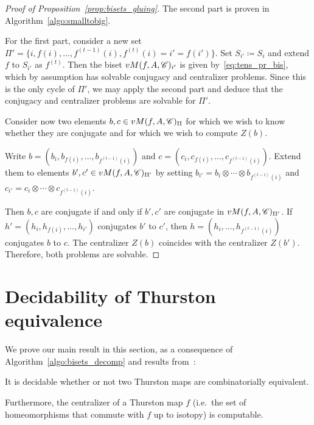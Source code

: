 \documentclass{amsart}
\begin{document}
\begin{proof}[Proof of Proposition~\ref{prop:bisets_gluing}]
  The second part is proven in Algorithm~\ref{algo:smalltobig}.

  For the first part, consider a new set
  $\Pi'=\{i,f(i),\dots,f^{(t-1)}(i),f^{(t)}(i)=i'=f(i')\}$. Set $S_{i'}\coloneqq S_i$ and extend $f$ to $S_{i'}$ as
  $f^{(t)}$. Then the biset $vM(f,A,{\mathscr C})_{i'}$ is given
  by~\eqref{eq:tens_pr_bis}, which by assumption has solvable
  conjugacy and centralizer problems. Since this is the only cycle of
  $\Pi'$, we may apply the second part and deduce that the conjugacy
  and centralizer problems are solvable for $\Pi'$.

  Consider now two elements $b,c\in vM(f,A,{\mathscr C})_\Pi$ for which we wish
  to know whether they are conjugate and for which we wish to compute
  $Z(b)$.

  Write $b=(b_i,b_{f(i)},\dots,b_{f^{(t-1)}(i)})$ and
  $c=(c_i,c_{f(i)},\dots,c_{f^{(t-1)}(i)})$. Extend them to elements
  $b',c'\in vM(f,A,{\mathscr C})_{\Pi'}$ by setting
  $b_{i'}=b_i\otimes\cdots\otimes b_{f^{(t-1)}(i)}$ and
  $c_{i'}=c_i\otimes\cdots\otimes c_{f^{(t-1)}(i)}$.

  Then $b,c$ are conjugate if and only if $b',c'$ are conjugate in
  $vM(f,A,{\mathscr C})_{\Pi'}$. If $h'=(h_i,h_{f(i)},\dots,h_{i'})$ conjugates
  $b'$ to $c'$, then $h=(h_i,\dots,h_{f^{(t-1)}(i)})$ conjugates $b$
  to $c$. The centralizer $Z(b)$ coincides with the centralizer
  $Z(b')$. Therefore, both problems are solvable.
\end{proof}

\section{Decidability of Thurston equivalence}
\label{s:CombEquiv}
We prove our main result in this section, as a consequence of
Algorithm~\ref{algo:bisets_decomp} and results
from~\cites{bartholdi-dudko:bc3,bartholdi-dudko:bc4}:
\begin{thm}\label{thm:A:new}
  It is decidable whether or not two Thurston maps are combinatorially
  equivalent.

  Furthermore, the centralizer of a Thurston map $f$ (i.e.\ the set of
  homeomorphisms that commute with $f$ up to isotopy) is computable.
\end{thm}
\end{document}
